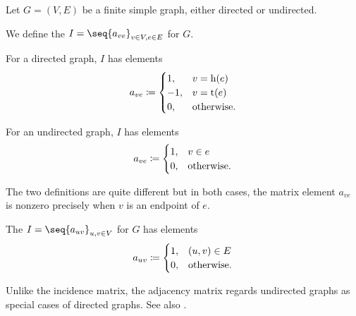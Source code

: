 \begin{definition}\label{def:graph_matrices}
  Let \( G = (V, E) \) be a finite simple graph, either directed or undirected.
  \begin{thmenum}
     We define the  \( I = \seq{ a_{ve} }_{v \in V, e \in E} \) for \( G \).

    \begin{minipage}[t]{0.45\textwidth}
      For a directed graph, \( I \) has elements
      \begin{equation*}
        a_{ve} \coloneqq \begin{cases}
          1,  & v = \head(e) \\
          -1, & v = \tail(e) \\
          0,  & \T{otherwise.}
        \end{cases}
      \end{equation*}
    \end{minipage}
    \hspace{0.02\textwidth}
    \begin{minipage}[t]{0.45\textwidth}
      For an undirected graph, \( I \) has elements
      \begin{equation*}
        a_{ve} \coloneqq \begin{cases}
          1,  & v \in e \\
          0,  & \T{otherwise.}
        \end{cases}
      \end{equation*}
    \end{minipage}

    The two definitions are quite different but in both cases, the matrix element \( a_{ve} \) is nonzero precisely when \( v \) is an endpoint of \( e \).

     The  \( I = \seq{ a_{uv} }_{u, v \in V} \) for \( G \) has elements
    \begin{equation*}
      a_{uv} \coloneqq \begin{cases}
        1,  & (u, v) \in E \\
        0,  & \T{otherwise.}
      \end{cases}
    \end{equation*}

    Unlike the incidence matrix, the adjacency matrix regards undirected graphs as special cases of directed graphs. See also .
  \end{thmenum}
\end{definition}

